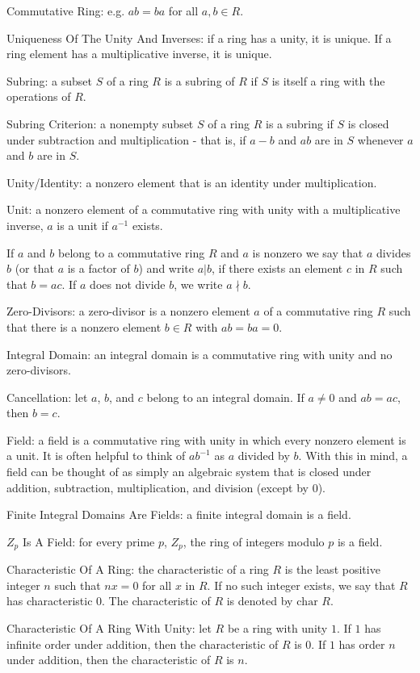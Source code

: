 Commutative Ring: e.g. $ab=ba$ for all $a,b \in R$.

Uniqueness Of The Unity And Inverses: if a ring has a unity, it is unique. If a ring element has a multiplicative inverse, it is unique.

Subring: a subset $S$ of a ring $R$ is a subring of $R$ if $S$ is itself a ring with the operations of $R$.

Subring Criterion: a nonempty subset $S$ of a ring $R$ is a subring if $S$ is closed under subtraction and multiplication - that is, if $a-b$ and $ab$ are in $S$ whenever $a$ and $b$ are in $S$.

Unity/Identity: a nonzero element that is an identity under multiplication.

Unit: a nonzero element of a commutative ring with unity with a multiplicative inverse, $a$ is a unit if $a^{-1}$ exists.

If $a$ and $b$ belong to a commutative ring $R$ and $a$ is nonzero we say that $a$ divides $b$ (or that $a$ is a factor of $b$) and write $a | b$, if there exists an element $c$ in $R$ such that $b=ac$. If $a$ does not divide $b$, we write $a \nmid b$.

Zero-Divisors: a zero-divisor is a nonzero element $a$ of a commutative ring $R$ such that there is a nonzero element $b \in R$ with $ab=ba=0$.

Integral Domain: an integral domain is a commutative ring with unity and no zero-divisors.

Cancellation: let $a$, $b$, and $c$ belong to an integral domain. If $a \neq 0$ and $ab=ac$, then $b=c$.

Field: a field is a commutative ring with unity in which every nonzero element is a unit. It is often helpful to think of $ab^{-1}$ as $a$ divided by $b$. With this in mind, a field can be thought of as simply an algebraic system that is closed under addition, subtraction, multiplication, and division (except by $0$).

Finite Integral Domains Are Fields: a finite integral domain is a field.

$Z_p$ Is A Field: for every prime $p$, $Z_p$, the ring of integers modulo $p$ is a field.

Characteristic Of A Ring: the characteristic of a ring $R$ is the least positive integer $n$ such that $nx=0$ for all $x$ in $R$. If no such integer exists, we say that $R$ has characteristic $0$. The characteristic of $R$ is denoted by $\text{char }R$.

Characteristic Of A Ring With Unity: let $R$ be a ring with unity $1$. If $1$ has infinite order under addition, then the characteristic of $R$ is $0$. If $1$ has order $n$ under addition, then the characteristic of $R$ is $n$.

